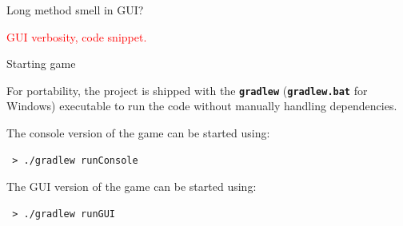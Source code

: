 \documentclass{beamer}
\begin{document}
  \begin{frame}{Long method smell in GUI?}

    \textcolor{red}{GUI verbosity, code snippet.}

  \end{frame}



  \begin{frame}[fragile]{Starting game}

    For portability, the project is shipped with the \texttt{\textbf{gradlew}} (\texttt{\textbf{gradlew.bat}} for Windows) executable to run the code without manually handling dependencies.

    \vspace{2em}

    The console version of the game can be started using:

    \begin{lstlisting}
 > ./gradlew runConsole
    \end{lstlisting}

    \vspace{1em}

    The GUI version of the game can be started using:

    \begin{lstlisting} 
 > ./gradlew runGUI
    \end{lstlisting}

  \end{frame}
\end{document}

